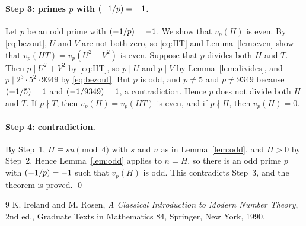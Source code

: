 \documentclass[11pt]{article}
\newcommand{\leg}[2]{\mathchoice{\biggl(\dfrac{#1}{#2}\biggr)}{(#1/#2)}{(#1/#2)}{(#1/#2)}}
\begin{document}
\paragraph{\texorpdfstring{Step 3: primes $p$ with $\leg{-1}{p}=-1$.}{Step 3: inert primes.}} Let $p$ be an odd prime with $\leg{-1}{p}=-1$. We show that $v_p(H)$ is even. By \eqref{eq:bezout}, $U$ and $V$ are not both zero, so \eqref{eq:HT} and Lemma~\ref{lem:even} show that $v_p(HT)=v_p(U^2+V^2)$ is even. Suppose that $p$ divides both $H$ and $T$. Then $p\mid U^2+V^2$ by \eqref{eq:HT}, so $p\mid U$ and $p\mid V$ by Lemma~\ref{lem:divides}, and $p\mid 2^{3}\cdot 5^{2}\cdot 9349$ by \eqref{eq:bezout}. But $p$ is odd, and $p\neq5$ and $p\neq9349$ because $\leg{-1}{5}=1$ and $\leg{-1}{9349}=1$, a contradiction. Hence $p$ does not divide both $H$ and $T$. If $p\nmid T$, then $v_p(H)=v_p(HT)$ is even, and if $p\nmid H$, then $v_p(H)=0$.

\paragraph{Step 4: contradiction.} By Step~1, $H\equiv su\pmod{4}$ with $s$ and $u$ as in Lemma~\ref{lem:odd}, and $H>0$ by Step~2. Hence Lemma~\ref{lem:odd} applies to $n=H$, so there is an odd prime $p$ with $\leg{-1}{p}=-1$ such that $v_p(H)$ is odd. This contradicts Step~3, and the theorem is proved.
\qed

\begin{thebibliography}{9}
 K. Ireland and M. Rosen, \emph{A Classical Introduction to Modern Number Theory}, 2nd ed., Graduate Texts in Mathematics 84, Springer, New York, 1990.
\end{thebibliography}
\end{document}
